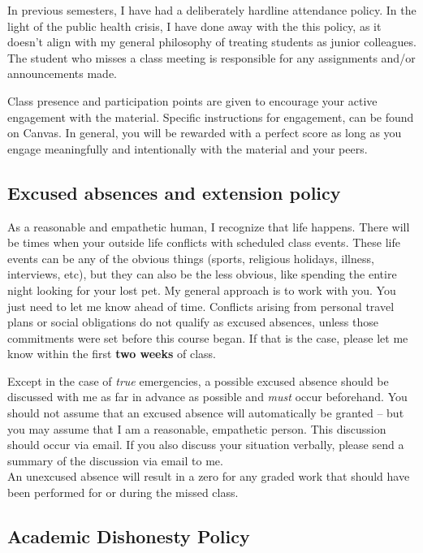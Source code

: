 \documentclass[11pt,]{article}
\begin{document}
In previous semesters, I have had a deliberately hardline attendance
policy. In the light of the public health crisis, I have done away with
the this policy, as it doesn't align with my general philosophy of
treating students as junior colleagues. The student who misses a class
meeting is responsible for any assignments and/or announcements made.

Class presence and participation points are given to encourage your
active engagement with the material. Specific instructions for
engagement, can be found on Canvas. In general, you will be rewarded
with a perfect score as long as you engage meaningfully and
intentionally with the material and your peers.

\hypertarget{excused-absences-and-extension-policy}{%
\subsection{Excused absences and extension
policy}\label{excused-absences-and-extension-policy}}

As a reasonable and empathetic human, I recognize that life happens.
There will be times when your outside life conflicts with scheduled
class events. These life events can be any of the obvious things
(sports, religious holidays, illness, interviews, etc), but they can
also be the less obvious, like spending the entire night looking for
your lost pet. My general approach is to work with you. You just need to
let me know ahead of time. Conflicts arising from personal travel plans
or social obligations do not qualify as excused absences, unless those
commitments were set before this course began. If that is the case,
please let me know within the first \textbf{two weeks} of class.

Except in the case of \emph{true} emergencies, a possible excused
absence should be discussed with me as far in advance as possible and
\emph{must} occur beforehand. You should not assume that an excused
absence will automatically be granted -- but you may assume that I am a
reasonable, empathetic person. This discussion should occur via email.
If you also discuss your situation verbally, please send a summary of
the discussion via email to me.\\
An unexcused absence will result in a zero for any graded work that
should have been performed for or during the missed class.

\hypertarget{academic-dishonesty-policy}{%
\subsection{Academic Dishonesty
Policy}\label{academic-dishonesty-policy}}
\end{document}
